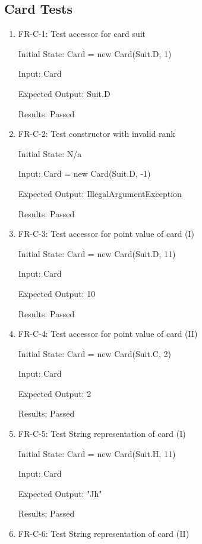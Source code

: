 \documentclass[12pt, titlepage]{article}
\begin{document}
\subsection{Card Tests}
\begin{enumerate}

    
    \item FR-C-1: Test accessor for card suit
    					
    Initial State: Card = new Card(Suit.D, 1)
    					
    Input: Card
    					
    Expected Output: Suit.D
    
    Results: Passed
    
    
    \item FR-C-2: Test constructor with invalid rank
    					
    Initial State: N/a
    					
    Input:  Card = new Card(Suit.D, -1)
    					
    Expected Output: IllegalArgumentException
    
    Results: Passed
    
   \item FR-C-3: Test accessor for point value of card (I)
   
    Initial State: Card  = new Card(Suit.D, 11)
    					
    Input: Card
    					
    Expected Output: 10
    
    Results: Passed					

    \item FR-C-4: Test accessor for point value of card (II)
    					
    Initial State: Card  = new Card(Suit.C, 2)
    					
    Input: Card
    					
    Expected Output: 2
    					
    Results: Passed
    
    \item FR-C-5: Test String representation of card (I)
    					
    Initial State: Card  = new Card(Suit.H, 11)
    					
    Input: Card
    					
    Expected Output: "Jh"
    					
    Results: Passed
    
    \item FR-C-6: Test String representation of card (II)
    					

\end{enumerate}
\end{document}
